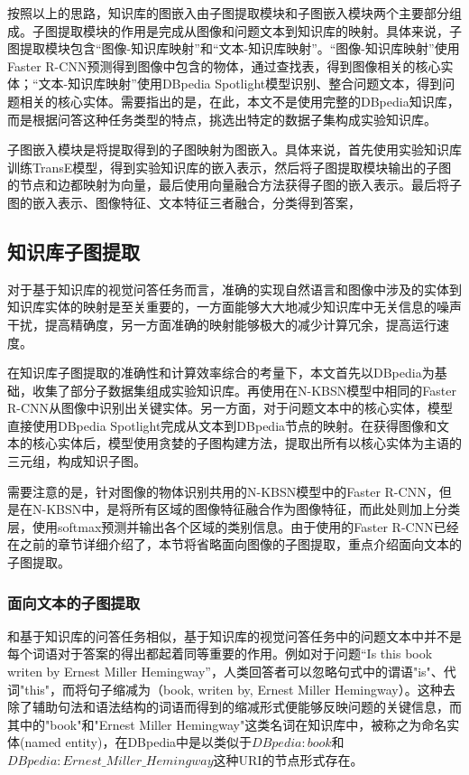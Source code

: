 按照以上的思路，知识库的图嵌入由子图提取模块和子图嵌入模块两个主要部分组成。子图提取模块的作用是完成从图像和问题文本到知识库的映射。具体来说，子图提取模块包含“图像-知识库映射”和“文本-知识库映射”。“图像-知识库映射”使用Faster R-CNN预测得到图像中包含的物体，通过查找表，得到图像相关的核心实体；“文本-知识库映射”使用DBpedia Spotlight模型识别、整合问题文本，得到问题相关的核心实体。需要指出的是，在此，本文不是使用完整的DBpedia知识库，而是根据问答这种任务类型的特点，挑选出特定的数据子集构成实验知识库。

子图嵌入模块是将提取得到的子图映射为图嵌入。具体来说，首先使用实验知识库训练TransE模型，得到实验知识库的嵌入表示，然后将子图提取模块输出的子图的节点和边都映射为向量，最后使用向量融合方法获得子图的嵌入表示。最后将子图的嵌入表示、图像特征、文本特征三者融合，分类得到答案，

\subsection{知识库子图提取}
对于基于知识库的视觉问答任务而言，准确的实现自然语言和图像中涉及的实体到知识库实体的映射是至关重要的，一方面能够大大地减少知识库中无关信息的噪声干扰，提高精确度，另一方面准确的映射能够极大的减少计算冗余，提高运行速度。

在知识库子图提取的准确性和计算效率综合的考量下，本文首先以DBpedia为基础，收集了部分子数据集组成实验知识库。再使用在N-KBSN模型中相同的Faster R-CNN从图像中识别出关键实体。另一方面，对于问题文本中的核心实体，模型直接使用DBpedia Spotlight完成从文本到DBpedia节点的映射。在获得图像和文本的核心实体后，模型使用贪婪的子图构建方法，提取出所有以核心实体为主语的三元组，构成知识子图。

需要注意的是，针对图像的物体识别共用的N-KBSN模型中的Faster R-CNN，但是在N-KBSN中，是将所有区域的图像特征融合作为图像特征，而此处则加上分类层，使用softmax预测并输出各个区域的类别信息。由于使用的Faster R-CNN已经在之前的章节详细介绍了，本节将省略面向图像的子图提取，重点介绍面向文本的子图提取。

\subsubsection{面向文本的子图提取}
和基于知识库的问答任务相似，基于知识库的视觉问答任务中的问题文本中并不是每个词语对于答案的得出都起着同等重要的作用。例如对于问题“Is this book writen by Ernest Miller Hemingway”，人类回答者可以忽略句式中的谓语"is"、代词"this"，而将句子缩减为（book, writen by, Ernest Miller Hemingway）。这种去除了辅助句法和语法结构的词语而得到的缩减形式便能够反映问题的关键信息，而其中的"book"和"Ernest Miller Hemingway"这类名词在知识库中，被称之为命名实体(named entity)，在DBpedia中是以类似于$DBpedia:book$和$DBpedia:Ernest\_Miller\_Hemingway$这种URI的节点形式存在。


